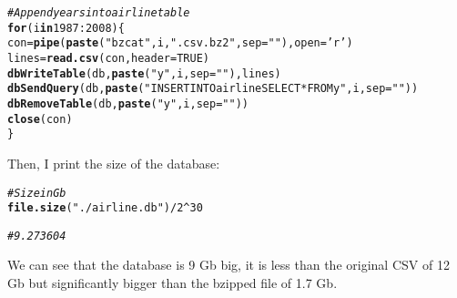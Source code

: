 \documentclass{llncs}\usepackage[]{graphicx}\usepackage[]{color}
\makeatletter
\newcommand{\hlnum}[1]{\textcolor[rgb]{0.686,0.059,0.569}{#1}}%
\newcommand{\hlstr}[1]{\textcolor[rgb]{0.192,0.494,0.8}{#1}}%
\newcommand{\hlcom}[1]{\textcolor[rgb]{0.678,0.584,0.686}{\textit{#1}}}%
\newcommand{\hlopt}[1]{\textcolor[rgb]{0,0,0}{#1}}%
\newcommand{\hlstd}[1]{\textcolor[rgb]{0.345,0.345,0.345}{#1}}%
\newcommand{\hlkwa}[1]{\textcolor[rgb]{0.161,0.373,0.58}{\textbf{#1}}}%
\newcommand{\hlkwb}[1]{\textcolor[rgb]{0.69,0.353,0.396}{#1}}%
\newcommand{\hlkwc}[1]{\textcolor[rgb]{0.333,0.667,0.333}{#1}}%
\newcommand{\hlkwd}[1]{\textcolor[rgb]{0.737,0.353,0.396}{\textbf{#1}}}%
\newenvironment{kframe}{%
 \def\at@end@of@kframe{}%
 \ifinner\ifhmode%
  \def\at@end@of@kframe{\end{minipage}}%
  \begin{minipage}{\columnwidth}%
 \fi\fi%
 \def\FrameCommand##1{\hskip\@totalleftmargin \hskip-\fboxsep
 \colorbox{shadecolor}{##1}\hskip-\fboxsep
     \hskip-\linewidth \hskip-\@totalleftmargin \hskip\columnwidth}%
 \MakeFramed {\advance\hsize-\width
   \@totalleftmargin\z@ \linewidth\hsize
   \@setminipage}}%
 {\par\unskip\endMakeFramed%
 \at@end@of@kframe}
\newenvironment{knitrout}{}{} %
\makeatother
\begin{document}
\begin{knitrout}
\color{fgcolor}\begin{kframe}
\begin{alltt}
\hlcom{# Append years into airline table}
\hlkwa{for} \hlstd{(i} \hlkwa{in} \hlnum{1987}\hlopt{:}\hlnum{2008}\hlstd{)\{}
  \hlstd{con}\hlkwb{=}\hlkwd{pipe}\hlstd{(}\hlkwd{paste}\hlstd{(}\hlstr{"bzcat "}\hlstd{,i,}\hlstr{".csv.bz2"}\hlstd{,}\hlkwc{sep}\hlstd{=}\hlstr{""}\hlstd{),} \hlkwc{open} \hlstd{=} \hlstr{'r'}\hlstd{)}
  \hlstd{lines} \hlkwb{=} \hlkwd{read.csv}\hlstd{(con,} \hlkwc{header} \hlstd{=} \hlnum{TRUE}\hlstd{)}
  \hlkwd{dbWriteTable}\hlstd{(db,} \hlkwd{paste}\hlstd{(}\hlstr{"y"}\hlstd{,i,}\hlkwc{sep}\hlstd{=}\hlstr{""}\hlstd{),lines)}
  \hlkwd{dbSendQuery}\hlstd{(db,}\hlkwd{paste}\hlstd{(}\hlstr{"INSERT INTO airline SELECT * FROM y"}\hlstd{,i,}\hlkwc{sep}\hlstd{=}\hlstr{""}\hlstd{))}
  \hlkwd{dbRemoveTable}\hlstd{(db,}\hlkwd{paste}\hlstd{(}\hlstr{"y"}\hlstd{,i,}\hlkwc{sep}\hlstd{=}\hlstr{""}\hlstd{))}
  \hlkwd{close}\hlstd{(con)}
\hlstd{\}}
\end{alltt}
\end{kframe}
\end{knitrout}
Then, I print the size of the database:
\begin{knitrout}
\color{fgcolor}\begin{kframe}
\begin{alltt}
\hlcom{# Size in Gb}
\hlkwd{file.size}\hlstd{(}\hlstr{"./airline.db"}\hlstd{)}\hlopt{/}\hlnum{2}\hlopt{^}\hlnum{30}

\hlcom{# 9.273604}
\end{alltt}
\end{kframe}
\end{knitrout}
We can see that the database is 9 Gb big, it is less than the original CSV of 12 Gb but significantly bigger than the bzipped file of 1.7 Gb.
\end{document}
